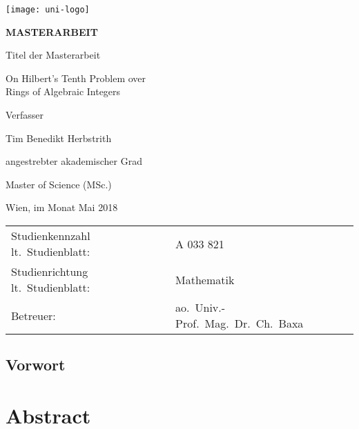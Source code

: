 
\begin{titlepage}
\begin{flushright}
    \texttt{[image: uni-logo]}
\end{flushright}
\vspace{0.5cm}

\begin{center}  %
    \Huge{\textsf{\textbf{\MakeUppercase{
        Masterarbeit
    }}}}
    \vspace{1.5cm}

    \large{\textsf{  %
        Titel der Masterarbeit
    }}
    \vspace{.1cm}

    \LARGE{\textsf{ On Hilbert's Tenth Problem over\\
                    Rings of Algebraic Integers
    }}
    \vfill

    \large{\textsf{  %
        Verfasser
    }}

    \Large{\textsf{  Tim Benedikt Herbstrith
    }}
    \vfill

    \large{\textsf{
        angestrebter akademischer Grad  %
    }}

    \Large{\textsf{  %
        Master of Science (MSc.)
    }}

\vspace{1.5cm}

\noindent\textsf{Wien, im Monat Mai 2018}  %
\vfill

\noindent\begin{tabular}{@{}ll}
\textsf{Studienkennzahl lt.\ Studienblatt:}
&
\textsf{A 033 821}  %
\\
\textsf{Studienrichtung lt.\ Studienblatt:}
&
\textsf{Mathematik}  %
\\
\textsf{Betreuer: }
&
\textsf{ao.~Univ.-Prof.~Mag.~Dr.~Ch.~Baxa}  %
\end{tabular}
\end{center}
\end{titlepage}

\cleardoublepage


\begin{german}
\section*{Vorwort}
\end{german}

\vspace{1.5cm}

\section*{Abstract}
\newpage
\thispagestyle{empty}
\tableofcontents
